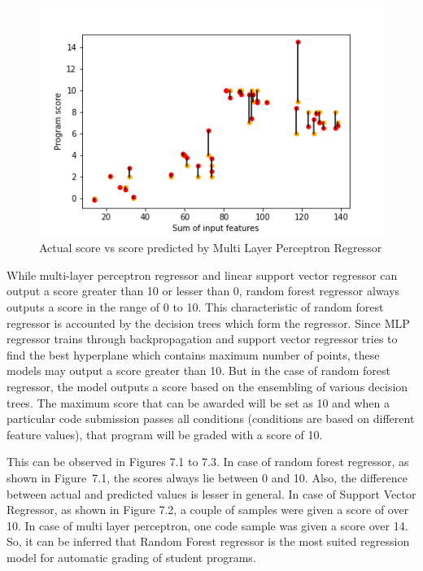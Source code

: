 \begin{figure}[H]
\centering
\includegraphics[scale=1.0]{./figures/ss_mlp.png}
\caption{Actual score vs score predicted by Multi Layer Perceptron Regressor}
\label{fig_rf}
\end{figure}

While multi-layer perceptron regressor and linear support vector
regressor can output a score greater than 10 or lesser than 0, random
forest regressor always outputs a score in the range of 0 to 10. This
characteristic of random forest regressor is accounted by the decision
trees which form the regressor. Since MLP regressor trains through
backpropagation and support vector regressor tries to find the best
hyperplane which contains maximum number of points, these models may
output a score greater than 10. But in the case of random forest
regressor, the model outputs a score based on the ensembling of
various decision trees. The maximum score that can be awarded will be
set as 10 and when a particular code submission passes all conditions
(conditions are based on different feature values), that program will
be graded with a score of 10.

This can be observed in Figures 7.1 to 7.3. In case of random forest
regressor, as shown in Figure~7.1, the scores always lie between 0 and
10. Also, the difference between actual and predicted values is lesser
in general. In case of Support Vector Regressor, as shown in Figure
7.2, a couple of samples were given a score of over 10. In case of
multi layer perceptron, one code sample was given a score over 14.
So, it can be inferred that Random Forest regressor is the most suited
regression model for automatic grading of student programs.



